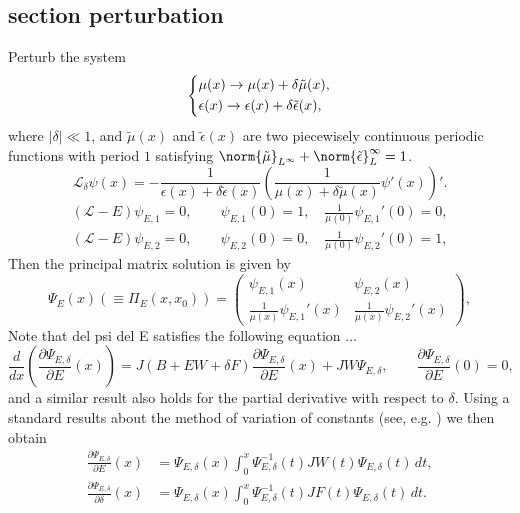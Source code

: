 \subsection{section perturbation }
%
Perturb the system
\begin{align*}
    \begin{dcases*}
        \mu(x) \to \mu(x) + \delta \tilde{\mu}(x),\\
        \epsilon(x) \to \epsilon(x) + \delta \tilde{\epsilon}(x),
    \end{dcases*}
\end{align*}
%
where $\lvert \delta \rvert \ll 1$, and $\tilde{\mu}(x)$ and $\tilde{\epsilon}(x)$ are two piecewisely continuous periodic functions with period $1$ satisfying $\norm{\tilde{\mu}}_{L^\infty} + \norm{\tilde{\epsilon}}_L^\infty = 1$.
%
\begin{equation}
    \mathcal{L}_{\delta}\psi(x) = - \frac{1}{\epsilon(x) + \delta \tilde{\epsilon}(x)} \left( \frac{1}{\mu(x) + \delta \tilde{\mu}(x)}\psi'(x) \right)'.
\end{equation}
%
\begin{align}
    (\mathcal{L}-E) \psi_{E,1} = 0,\qquad \psi_{E,1}(0) = 1,\quad \frac{1}{\mu(0)} \psi_{E,1}'(0) = 0,\\
    (\mathcal{L}-E) \psi_{E,2} = 0,\qquad \psi_{E,2}(0) = 0,\quad \frac{1}{\mu(0)} \psi_{E,2}'(0) = 1,
\end{align}
Then the principal matrix solution is given by
\begin{equation}
    \Psi_E(x) (\equiv \Pi_E(x,x_0)) = 
    \begin{pmatrix}
        \psi_{E,1}(x) & \psi_{E,2}(x)\\
        \frac{1}{\mu(x)}\psi_{E,1}'(x) & \frac{1}{\mu(x)}\psi_{E,2}'(x)
    \end{pmatrix},
\end{equation}
%
%
Note that del psi del E satisfies the following equation ...
\begin{equation}
    \frac{d}{dx} \left( \frac{\partial \Psi_{E,\delta}}{\partial E}(x) \right) = J(B+EW+\delta F) \frac{\partial \Psi_{E,\delta}}{\partial E}(x) + JW \Psi_{E,\delta}, \qquad \frac{\partial \Psi_{E,\delta}}{\partial E}(0) = 0,
\end{equation}
and a similar result also holds for the partial derivative with respect to $\delta$. Using a standard results about the method of variation of constants (see, e.g. \cite[Proposition~1.2.2]{Brown2013}) we then obtain
\begin{align}
    \frac{\partial \Psi_{E,\delta}}{\partial E}(x) &= \Psi_{E,\delta}(x) \int_0^x \Psi_{E,\delta}^{-1}(t) J W(t) \Psi_{E,\delta}(t) \, dt,\\
    \frac{\partial \Psi_{E,\delta}}{\partial \delta}(x) &= \Psi_{E,\delta}(x) \int_0^x \Psi_{E,\delta}^{-1}(t) J F(t) \Psi_{E,\delta}(t) \, dt.
\end{align}
